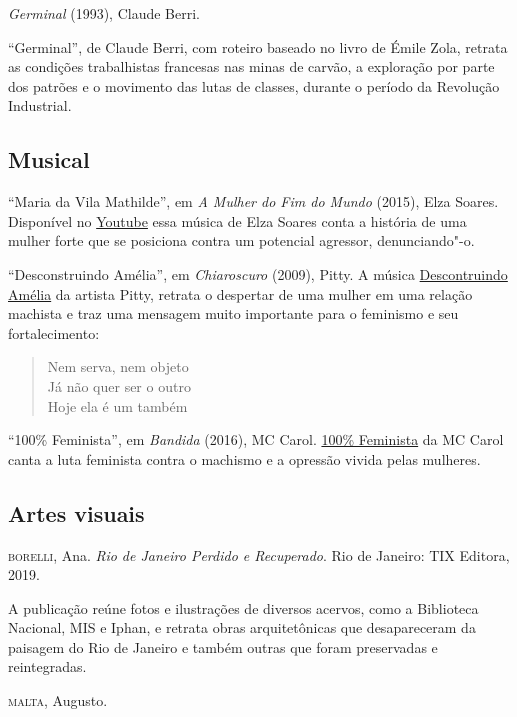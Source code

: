 \documentclass[12pt]{extarticle}
\begin{document}
\emph{Germinal} (1993), Claude Berri.

``Germinal'', de Claude Berri, com roteiro baseado no livro de Émile Zola, retrata as 
condições trabalhistas francesas nas minas de carvão, a exploração por parte dos 
patrões e o movimento das lutas de classes, durante o período 
da Revolução Industrial.

\subsection{Musical}

``Maria da Vila Mathilde'', em \emph{A Mulher do Fim do Mundo} (2015), Elza Soares.
Disponível no \href{https://www.youtube.com/watch?v=-09qfhVdzz8&ab_channel=circus}{Youtube} 
essa música de Elza Soares conta a história de uma mulher forte que se posiciona contra 
um potencial agressor, denunciando"-o. 

``Desconstruindo Amélia'', em \emph{Chiaroscuro} (2009), Pitty.
A música \href{https://www.youtube.com/watch?v=ygcrcRgVxMI&ab_channel=PittyNews}{Descontruindo Amélia} da artista Pitty, 
retrata o despertar de uma mulher em uma relação machista e traz uma mensagem muito importante para o feminismo e seu 
fortalecimento: 

\begin{verse}
Nem serva, nem objeto\\
Já não quer ser o outro\\
Hoje ela é um também\\
\end{verse}

``100\% Feminista'', em \emph{Bandida} (2016), MC Carol.
\href{https://www.youtube.com/watch?v=W05v0B59K5s&ab_channel=McCarolOficial}{100\% Feminista} da MC Carol canta a luta feminista 
contra o machismo e a opressão vivida pelas mulheres. 

\subsection{Artes visuais}

\textsc{borelli}, Ana. \emph{Rio de Janeiro Perdido e Recuperado}. Rio de Janeiro: TIX
Editora, 2019.

A publicação reúne fotos e ilustrações de diversos acervos, como a Biblioteca Nacional, 
MIS e Iphan, e retrata obras arquitetônicas que desapareceram da paisagem do Rio de 
Janeiro e também outras que foram preservadas e reintegradas.

\textsc{malta}, Augusto.
\end{document}
